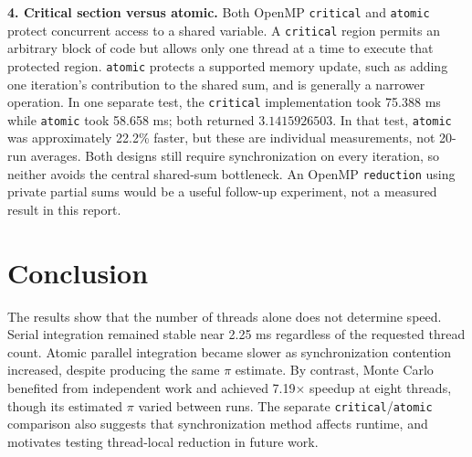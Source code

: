 \documentclass[11pt]{article}
\begin{document}
\textbf{4. Critical section versus atomic.} Both OpenMP \texttt{critical} and \texttt{atomic} protect concurrent access to a shared variable. A \texttt{critical} region permits an arbitrary block of code but allows only one thread at a time to execute that protected region. \texttt{atomic} protects a supported memory update, such as adding one iteration's contribution to the shared sum, and is generally a narrower operation. In one separate test, the \texttt{critical} implementation took 75.388 ms while \texttt{atomic} took 58.658 ms; both returned $3.1415926503$. In that test, \texttt{atomic} was approximately 22.2\% faster, but these are individual measurements, not 20-run averages. Both designs still require synchronization on every iteration, so neither avoids the central shared-sum bottleneck. An OpenMP \texttt{reduction} using private partial sums would be a useful follow-up experiment, not a measured result in this report.

\section{Conclusion}
The results show that the number of threads alone does not determine speed. Serial integration remained stable near 2.25 ms regardless of the requested thread count. Atomic parallel integration became slower as synchronization contention increased, despite producing the same $\pi$ estimate. By contrast, Monte Carlo benefited from independent work and achieved 7.19$\times$ speedup at eight threads, though its estimated $\pi$ varied between runs. The separate \texttt{critical}/\texttt{atomic} comparison also suggests that synchronization method affects runtime, and motivates testing thread-local reduction in future work.
\end{document}
